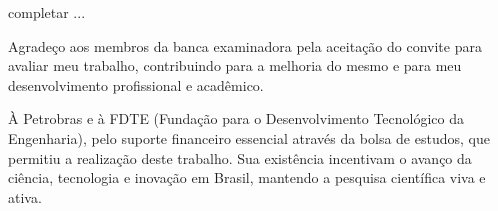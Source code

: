 





completar ...

Agradeço aos membros da banca examinadora pela aceitação do convite para avaliar meu trabalho, contribuindo para a melhoria do mesmo e para meu desenvolvimento profissional e acadêmico.

À Petrobras e à FDTE (Fundação para o Desenvolvimento Tecnológico da Engenharia), pelo suporte financeiro essencial através da bolsa de estudos, que permitiu a realização deste trabalho. Sua existência incentivam o avanço da ciência, tecnologia e inovação em Brasil, mantendo a pesquisa científica viva e ativa.

